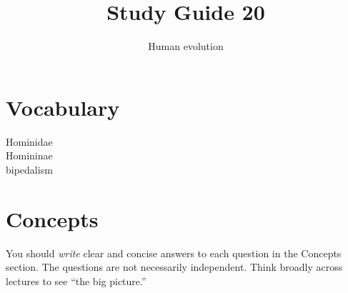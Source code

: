 \documentclass[letterpaper]{tufte-handout}
\title{Study Guide 20\hfill}
\author{Human evolution}
\date{} %
\begin{document}
\maketitle	%

\section{Vocabulary}

\begin{multicols}{2}
Hominidae \\
Homininae \\
bipedalism 
\end{multicols}


\section{Concepts}

You should \emph{write} clear and concise answers to each question in the Concepts section.  The questions are not necessarily independent.  Think broadly across lectures to see ``the big picture.'' 
\end{document}
